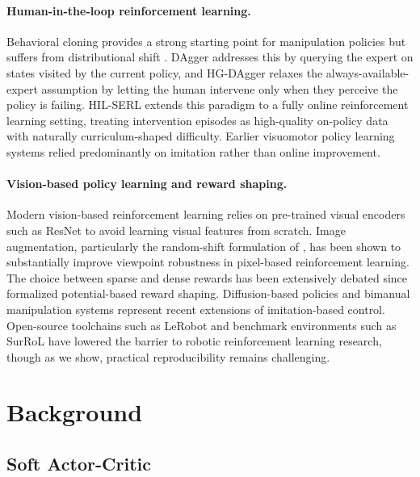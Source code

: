 \documentclass[12pt,a4paper]{article}
\begin{document}
\paragraph{Human-in-the-loop reinforcement learning.} Behavioral cloning provides a strong starting point for manipulation policies but suffers from distributional shift \citep{ross2011reduction}. DAgger \citep{ross2011reduction} addresses this by querying the expert on states visited by the current policy, and HG-DAgger \citep{kelly2019hg} relaxes the always-available-expert assumption by letting the human intervene only when they perceive the policy is failing. HIL-SERL \citep{luo2024serl} extends this paradigm to a fully online reinforcement learning setting, treating intervention episodes as high-quality on-policy data with naturally curriculum-shaped difficulty. Earlier visuomotor policy learning systems \citep{levine2018learning,florence2022implicit} relied predominantly on imitation rather than online improvement.

\paragraph{Vision-based policy learning and reward shaping.} Modern vision-based reinforcement learning relies on pre-trained visual encoders such as ResNet \citep{he2016deep} to avoid learning visual features from scratch. Image augmentation, particularly the random-shift formulation of \citet{yarats2021mastering}, has been shown to substantially improve viewpoint robustness in pixel-based reinforcement learning. The choice between sparse and dense rewards has been extensively debated since \citet{ng1999policy} formalized potential-based reward shaping. Diffusion-based policies \citep{chi2023diffusion} and bimanual manipulation systems \citep{zhao2023learning} represent recent extensions of imitation-based control. Open-source toolchains such as LeRobot \citep{cadene2024lerobot} and benchmark environments such as SurRoL \citep{xu2021surrol} have lowered the barrier to robotic reinforcement learning research, though as we show, practical reproducibility remains challenging.

\section{Background} \label{sec:background}

\subsection{Soft Actor-Critic}
\end{document}

